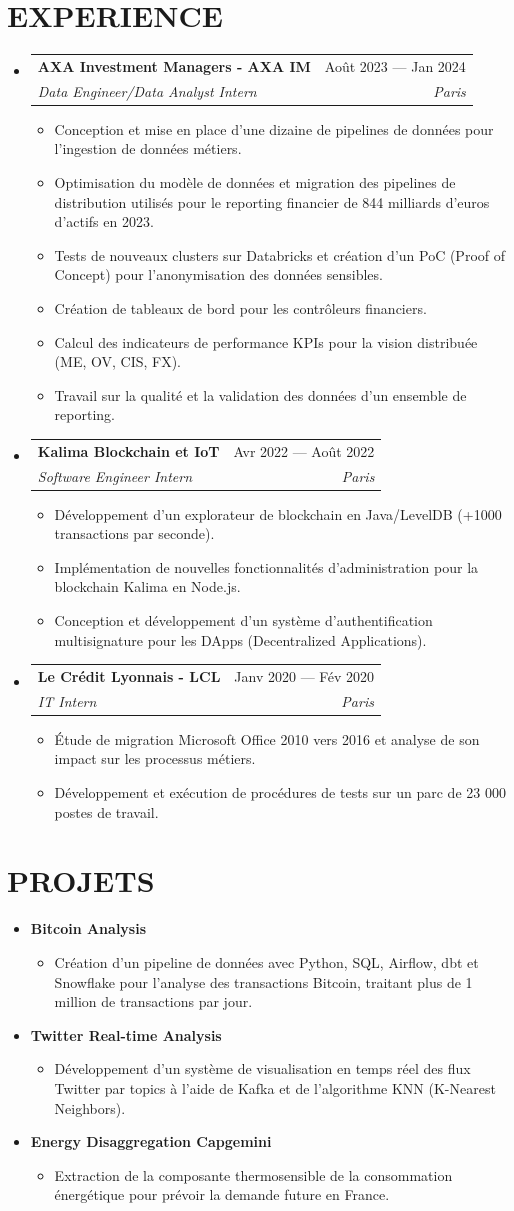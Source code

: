 \documentclass[11pt,a4paper]{article}
\makeatletter
\newcommand{\resumeItem}[1]{
  \item\footnotesize{
    {#1 \vspace{-1pt}}
  }
}
\newcommand{\resumeSubheading}[4]{
  \vspace{2pt}\item
    \begin{tabular*}{\textwidth}[t]{l@{\extracolsep{\fill}}r}
      {\small\textbf{#1}} & {\footnotesize#2} \\
      {\footnotesize\textit{#3}} & {\footnotesize\textit{#4}} \\
    \end{tabular*}\vspace{-4pt}
}
\newcommand{\resumeProjectHeading}[2]{
  \item
  {\small#1} \hfill {#2}
}
\newcommand{\resumeSubHeadingListStart}{\begin{itemize}[leftmargin=0in, label={}]}
\newcommand{\resumeSubHeadingListEnd}{\end{itemize}}
\newcommand{\resumeItemListStart}{\begin{itemize}[label={\textbullet}]}
\newcommand{\resumeItemListEnd}{\end{itemize}\vspace{0pt}}
\makeatother
\begin{document}
\section{EXPERIENCE}
\resumeSubHeadingListStart
    \resumeSubheading
      {AXA Investment Managers - AXA IM}{Août 2023 --- Jan 2024}
      {Data Engineer/Data Analyst Intern}{Paris}
      \resumeItemListStart
        \resumeItem{Conception et mise en place d'une dizaine de pipelines de données pour l'ingestion de données métiers.}
        \resumeItem{Optimisation du modèle de données et migration des pipelines de distribution utilisés pour le reporting financier de 844 milliards d'euros d'actifs en 2023.}
        \resumeItem{Tests de nouveaux clusters sur Databricks et création d'un PoC (Proof of Concept) pour l'anonymisation des données sensibles.}
        \resumeItem{Création de tableaux de bord pour les contrôleurs financiers.}
        \resumeItem{Calcul des indicateurs de performance KPIs pour la vision distribuée (ME, OV, CIS, FX).}
        \resumeItem{Travail sur la qualité et la validation des données d'un ensemble de reporting.}
      \resumeItemListEnd
    \resumeSubheading
      {Kalima Blockchain et IoT}{Avr 2022 --- Août 2022}
      {Software Engineer Intern}{Paris}
      \resumeItemListStart
        \resumeItem{Développement d'un explorateur de blockchain en Java/LevelDB (+1000 transactions par seconde).}
        \resumeItem{Implémentation de nouvelles fonctionnalités d'administration pour la blockchain Kalima en Node.js.}
        \resumeItem{Conception et développement d'un système d'authentification multisignature pour les DApps (Decentralized Applications).}
      \resumeItemListEnd
    \resumeSubheading
      {Le Crédit Lyonnais - LCL}{Janv 2020 --- Fév 2020}
      {IT Intern}{Paris}
      \resumeItemListStart
        \resumeItem{Étude de migration Microsoft Office 2010 vers 2016 et analyse de son impact sur les processus métiers.}
        \resumeItem{Développement et exécution de procédures de tests sur un parc de 23 000 postes de travail.}
      \resumeItemListEnd
  \resumeSubHeadingListEnd

\section{PROJETS}
\resumeSubHeadingListStart
    \resumeProjectHeading
      {\textbf{Bitcoin Analysis}} {}
      \resumeItemListStart
        \resumeItem{Création d'un pipeline de données avec Python, SQL, Airflow, dbt et Snowflake pour l'analyse des transactions Bitcoin, traitant plus de 1 million de transactions par jour.}
      \resumeItemListEnd
    \resumeProjectHeading
      {\textbf{Twitter Real-time Analysis}} {}
      \resumeItemListStart
        \resumeItem{Développement d'un système de visualisation en temps réel des flux Twitter par topics à l'aide de Kafka et de l'algorithme KNN (K-Nearest Neighbors).}
      \resumeItemListEnd
    \resumeProjectHeading
      {\textbf{Energy Disaggregation \@ Capgemini}} {}
      \resumeItemListStart
        \resumeItem{Extraction de la composante thermosensible de la consommation énergétique pour prévoir la demande future en France.}
      \resumeItemListEnd
\resumeSubHeadingListEnd
\end{document}
